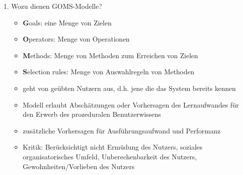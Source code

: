 \begin{enumerate}
	\item Wozu dienen GOMS-Modelle?
	\begin{itemize}
		\item \textbf{G}oals: eine Menge von Zielen
		\item \textbf{O}perators: Menge von Operationen
		\item \textbf{M}ethods: Menge von Methoden zum Erreichen von Zielen
		\item \textbf{S}election rules: Menge von Auswahlregeln von Methoden
		\item geht von geübten Nutzern aus, d.h. jene die das System bereits kennen
		\item Modell erlaubt Abschätzungen oder Vorhersagen des Lernaufwandes für den Erwerb des prozeduralen Benutzerwissens
		\item zusätzliche Vorhersagen für Ausführungsaufwand und Performanz 
		\item Kritik: Berücksichtigt nicht Ermüdung des Nutzers, soziales organisatorisches Umfeld, Unberechenbarkeit des Nutzers, Gewohnheiten/Vorlieben des Nutzers
	\end{itemize}
\end{enumerate}


